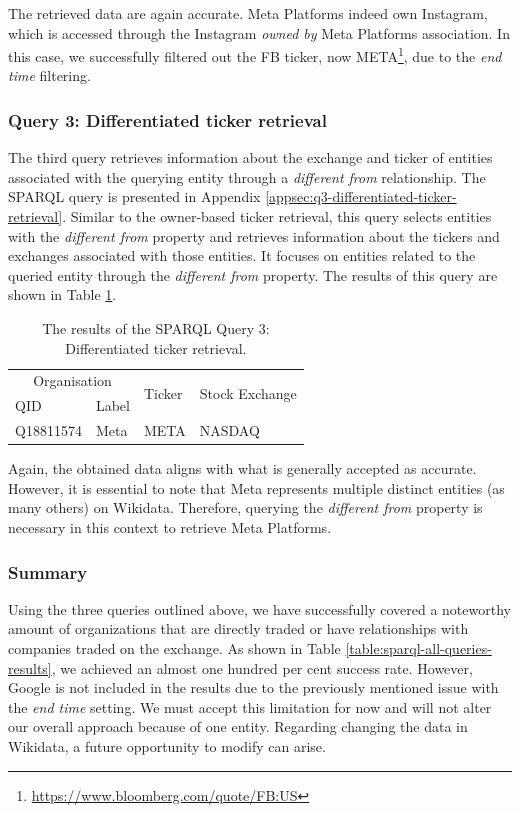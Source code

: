 {The retrieved data are again accurate. Meta Platforms indeed own Instagram, which is accessed through the Instagram \textit{owned by} Meta Platforms association. In this case, we successfully filtered out the FB ticker, now META\footnote{\href{https://www.bloomberg.com/quote/FB:US}{https://www.bloomberg.com/quote/FB:US}}, due to the \textit{end time} filtering.

\subsubsection{Query 3: Differentiated ticker retrieval}
\label{subsubsec:q3-differentiated-ticker-retrieval}
The third query retrieves information about the exchange and ticker of entities associated with the querying entity through a \textit{different from} relationship. The SPARQL query is presented in Appendix \ref{appsec:q3-differentiated-ticker-retrieval}. Similar to the owner-based ticker retrieval, this query selects entities with the \textit{different from} property and retrieves information about the tickers and exchanges associated with those entities. It focuses on entities related to the queried entity through the \textit{different from} property. The results of this query are shown in Table \ref{table:sparql_query_3_results}.

\begin{table}[ht]
    \centering
    \caption{The results of the SPARQL Query 3: Differentiated ticker retrieval.}
    \label{table:sparql_query_3_results}
    \begin{tabular}{l l l l}
    \hline
    \multicolumn{2}{c}{Organisation} & \multirow{2}{*}{Ticker} & \multirow{2}{*}{Stock Exchange}\\
    \cline{1-2}
    QID & Label \\
    \hline
    Q18811574 & Meta & META & NASDAQ \\ \hline
    \end{tabular}
\end{table}    

Again, the obtained data aligns with what is generally accepted as accurate. However, it is essential to note that Meta represents multiple distinct entities (as many others) on Wikidata. Therefore, querying the \textit{different from} property is necessary in this context to retrieve Meta Platforms.

\subsubsection*{Summary}
\label{subsubsec:sparql-wrapper-summary}
Using the three queries outlined above, we have successfully covered a noteworthy amount of organizations that are directly traded or have relationships with companies traded on the exchange. As shown in Table \ref{table:sparql-all-queries-results}, we achieved an almost one hundred per cent success rate. However, Google is not included in the results due to the previously mentioned issue with the \textit{end time} setting. We must accept this limitation for now and will not alter our overall approach because of one entity. Regarding changing the data in Wikidata, a future opportunity to modify can arise.

}
